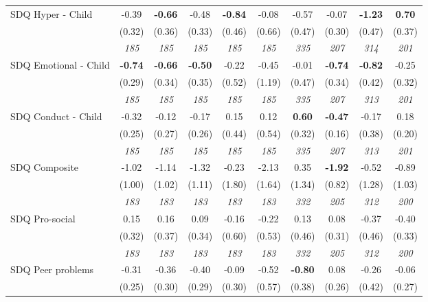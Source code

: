 \begin{tabular}{l c c c c c c c c c}
SDQ Hyper - Child & -0.39 & \textbf{ -0.66 } & -0.48 & \textbf{-0.84} & -0.08 & -0.57 & -0.07 & \textbf{ -1.23 } & \textbf{0.70} \\
& (0.32) & (0.36) & (0.33) & (0.46) & (0.66) & (0.47) & (0.30) & (0.47) & (0.37) \\
& \textit{ 185 } & \textit{ 185 } & \textit{ 185 } & \textit{ 185 } & \textit{ 185 } & \textit{ 335 } & \textit{ 207 } & \textit{ 314 } & \textit{ 201 } \\
SDQ Emotional - Child & \textbf{ -0.74 } & \textbf{ -0.66 } & \textbf{ -0.50 } & -0.22 & -0.45 & -0.01 & \textbf{-0.74} & \textbf{ -0.82 } & -0.25 \\
& (0.29) & (0.34) & (0.35) & (0.52) & (1.19) & (0.47) & (0.34) & (0.42) & (0.32) \\
& \textit{ 185 } & \textit{ 185 } & \textit{ 185 } & \textit{ 185 } & \textit{ 185 } & \textit{ 335 } & \textit{ 207 } & \textit{ 313 } & \textit{ 201 } \\
SDQ Conduct - Child & -0.32 & -0.12 & -0.17 & 0.15 & 0.12 & \textbf{ 0.60 } & \textbf{-0.47} & -0.17 & 0.18 \\
& (0.25) & (0.27) & (0.26) & (0.44) & (0.54) & (0.32) & (0.16) & (0.38) & (0.20) \\
& \textit{ 185 } & \textit{ 185 } & \textit{ 185 } & \textit{ 185 } & \textit{ 185 } & \textit{ 335 } & \textit{ 207 } & \textit{ 313 } & \textit{ 201 } \\
SDQ Composite & -1.02 & -1.14 & -1.32 & -0.23 & -2.13 & 0.35 & \textbf{-1.92} & -0.52 & -0.89 \\
& (1.00) & (1.02) & (1.11) & (1.80) & (1.64) & (1.34) & (0.82) & (1.28) & (1.03) \\
& \textit{ 183 } & \textit{ 183 } & \textit{ 183 } & \textit{ 183 } & \textit{ 183 } & \textit{ 332 } & \textit{ 205 } & \textit{ 312 } & \textit{ 200 } \\
SDQ Pro-social & 0.15 & 0.16 & 0.09 & -0.16 & -0.22 & 0.13 & 0.08 & -0.37 & -0.40 \\
& (0.32) & (0.37) & (0.34) & (0.60) & (0.53) & (0.46) & (0.31) & (0.46) & (0.33) \\
& \textit{ 183 } & \textit{ 183 } & \textit{ 183 } & \textit{ 183 } & \textit{ 183 } & \textit{ 332 } & \textit{ 205 } & \textit{ 312 } & \textit{ 200 } \\
SDQ Peer problems & -0.31 & -0.36 & -0.40 & -0.09 & -0.52 & \textbf{ -0.80 } & 0.08 & -0.26 & -0.06 \\
& (0.25) & (0.30) & (0.29) & (0.30) & (0.57) & (0.38) & (0.26) & (0.42) & (0.27) \\

\end{tabular}

